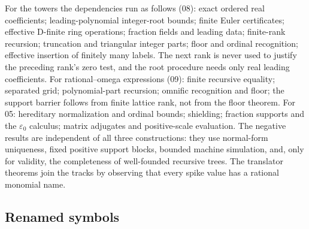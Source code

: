 \documentclass[11pt,oneside]{article}
\numberwithin{equation}{section}
\theoremstyle{definition}
\theoremstyle{remark}
\begin{document}
For the towers the dependencies run as follows (08): exact ordered real
coefficients; leading-polynomial integer-root bounds; finite Euler certificates;
effective D-finite ring operations; fraction fields and leading data; finite-rank
recursion; truncation and triangular integer parts; floor and ordinal recognition;
effective insertion of finitely many labels. The next rank is never used to justify
the preceding rank's zero test, and the root procedure needs only real leading
coefficients. For rational--omega expressions (09): finite recursive equality;
separated grid; polynomial-part recursion; omnific recognition and floor; the
support barrier follows from finite lattice rank, not from the floor theorem. For
05: hereditary normalization and ordinal bounds; shielding; fraction supports and
the $\varepsilon_0$ calculus; matrix adjugates and positive-scale evaluation. The
negative results are independent of all three constructions: they use normal-form
uniqueness, fixed positive support blocks, bounded machine simulation, and, only
for validity, the completeness of well-founded recursive trees. The translator
theorems join the tracks by observing that every spike value has a rational
monomial name.

\subsection{Renamed symbols}
\end{document}
